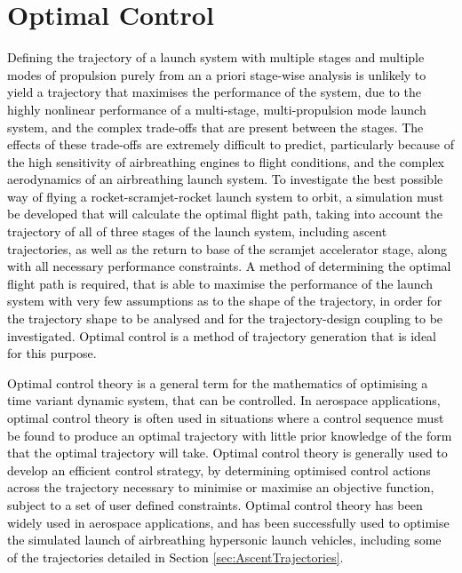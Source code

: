 \section{Optimal Control}\label{sec:Optimisation}





\textcolor{black}{
	Defining the trajectory of a launch system with multiple stages and multiple modes of propulsion purely from an a priori stage-wise analysis is unlikely to yield a trajectory that maximises the performance of the system, due to the highly nonlinear performance of a multi-stage, multi-propulsion mode launch system, and the complex trade-offs that are present between the stages. The effects of these trade-offs are extremely difficult to predict, particularly because of the high sensitivity of airbreathing engines to flight conditions, and the complex aerodynamics of an airbreathing launch system. 
	To investigate the best possible way of flying a rocket-scramjet-rocket launch system to orbit, a simulation must be developed that will calculate the optimal flight path, taking into account the trajectory of all of three stages of the launch system, including ascent trajectories, as well as the return to base of the scramjet accelerator stage, along with all necessary performance constraints. 
A method of determining the optimal flight path is required, that is able to maximise the performance of the launch system with very few assumptions as to the shape of the trajectory, in order for the trajectory shape to be analysed and for the trajectory-design coupling to be investigated. 
Optimal control is a method of trajectory generation that is ideal for this purpose.
}

\textcolor{black}{
Optimal control theory is a general term for the mathematics of optimising a time variant dynamic system, that can be controlled. 
In aerospace applications, optimal control theory is often used in situations where a control sequence must be found to produce an optimal trajectory with little prior knowledge of the form that the optimal trajectory will take. 
Optimal control theory is generally used to develop an efficient control strategy, by determining optimised control actions across the trajectory necessary to minimise or maximise an objective function, subject to a set of user defined constraints.  
Optimal control theory has been widely used in aerospace applications, and has been successfully used to optimise the simulated launch of airbreathing hypersonic launch vehicles\cite{Powell1991,Lu1993,Trefny1999,Roche2000,Pescetelli2012,Young2006}, including some of the trajectories detailed in Section \ref{sec:AscentTrajectories}. 
}

